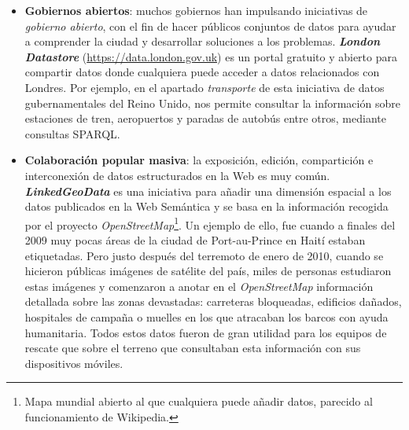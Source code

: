 \begin{itemize}
	\item \textbf{Gobiernos abiertos}: muchos gobiernos han impulsando iniciativas de \textit{gobierno abierto}, con el fin de hacer públicos conjuntos de datos para ayudar a comprender la ciudad y desarrollar soluciones a los problemas. \textit{\textbf{London Datastore}} (\url{https://data.london.gov.uk}) es un portal gratuito y abierto para compartir datos donde cualquiera puede acceder a datos relacionados con Londres. Por ejemplo, en el apartado \textit{transporte} de esta iniciativa de datos gubernamentales del Reino Unido, nos permite consultar la información sobre estaciones de tren, aeropuertos y paradas de autobús entre otros, mediante consultas SPARQL.

	\item \textbf{Colaboración popular masiva}: la exposición, edición, compartición e interconexión de datos estructurados en la Web es muy común. \textit{\textbf{LinkedGeoData}} es una iniciativa para añadir una dimensión espacial a los datos publicados en la Web Semántica y se basa en la información recogida por el proyecto \textit{OpenStreetMap}\footnote{Mapa mundial abierto al que cualquiera puede añadir datos, parecido al funcionamiento de Wikipedia.}. Un ejemplo de ello, fue cuando a finales del 2009 muy pocas áreas de la ciudad de Port-au-Prince en Haití estaban etiquetadas. Pero justo después del terremoto de enero de 2010, cuando se hicieron públicas imágenes de satélite del país, miles de personas estudiaron estas imágenes y comenzaron a anotar en el \textit{OpenStreetMap} información detallada sobre las zonas devastadas: carreteras bloqueadas, edificios dañados, hospitales de campaña o muelles en los que atracaban los barcos con ayuda humanitaria. Todos estos datos fueron de gran utilidad para los equipos de rescate que sobre el terreno que consultaban esta información con sus dispositivos móviles.
	
\end{itemize}



